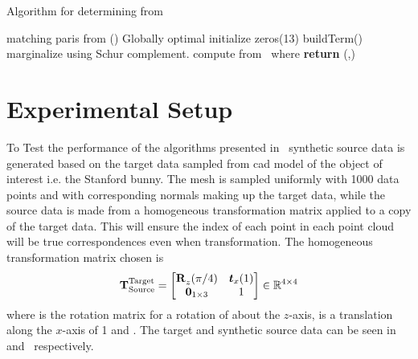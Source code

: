 \begin{algorithm}
	\algrenewcommand{}
	\algrenewcommand{}
	\caption{Algorithm for determining \tf[t]{\star}{} from }
	\label{alg:t-star}
	\begin{algorithmic}[1]
		\Require matching paris from ()
		\Ensure Globally optimal \tf[T]{\star}{}
		\State initialize  zeros(\num{13})
			\State {} buildTerm() 
			\State {}
		\EndFor
		\State marginalize  using Schur complement.
		\State compute \tf[R]{\star}{} from~
		\State {} where 
		\State \textbf{return} \tf[T]{\star}{}(\tf[R]{\star}{},)
	\end{algorithmic}
\end{algorithm}

\section{Experimental Setup}\label{sec:2-pose-estimation-experimental-setup}

To Test the performance of the algorithms presented in~ synthetic source data is generated based on the target data sampled from \gls{cad} model of the object of interest i.e. the Stanford bunny. The mesh is sampled uniformly with \num{1000} data points and with corresponding normals making up the target data, while the source data is made from a homogeneous transformation matrix applied to a copy of the target data. This will ensure the index  of each point in each point cloud will be true correspondences even when transformation. The homogeneous transformation matrix chosen is
\begin{equation}
	\tf[T]{\text{Target}}{\text{Source}} = 
	\begin{bmatrix}
		\tf[R]{}{z}(\pi/4) & \vec{t}_x(1) \\
		\vec{0}_{1\times 3} & 1
	\end{bmatrix}\inR{4\times 4}
\end{equation} 
where  is the rotation matrix for a rotation of  about the $z$-axis,  is a translation along the $x$-axis of \num{1} and . The target and synthetic source data can be seen in  and~ respectively.

